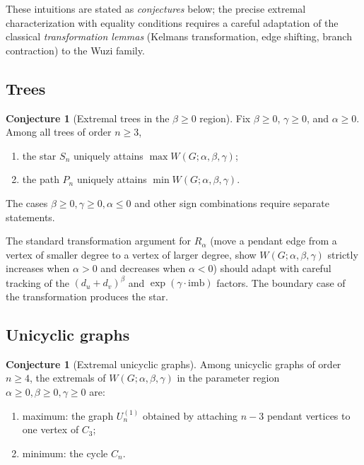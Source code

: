 \documentclass[11pt,a4paper]{article}
\theoremstyle{definition}
\newtheorem{conjecture}[theorem]{Conjecture}
\newcommand{\Wuzi}{W(G;\alpha,\beta,\gamma)}
\newcommand{\todo}[1]{}
\begin{document}
These intuitions are stated as \emph{conjectures} below; the
precise extremal characterization with equality conditions
requires a careful adaptation of the classical
\emph{transformation lemmas} (Kelmans transformation, edge
shifting, branch contraction) to the Wuzi family.

\subsection{Trees}

\begin{conjecture}[Extremal trees in the $\beta\ge 0$ region]
\label{conj:trees_beta_pos}
Fix $\beta\ge 0$, $\gamma\ge 0$, and $\alpha\ge 0$. Among all
trees of order $n\ge 3$,
\begin{enumerate}[label=(\alph*)]
\item the star $S_n$ uniquely attains $\max\Wuzi$;
\item the path $P_n$ uniquely attains $\min\Wuzi$.
\end{enumerate}
The cases $\beta\ge 0,\gamma\ge 0,\alpha\le 0$ and other sign
combinations require separate statements.
\end{conjecture}

\todo{PROOF STRATEGY} The standard transformation argument for
$R_\alpha$ (move a pendant edge from a vertex of smaller degree
to a vertex of larger degree, show $\Wuzi$ strictly increases when
$\alpha>0$ and decreases when $\alpha<0$) should adapt with
careful tracking of the $(d_u+d_v)^\beta$ and
$\exp(\gamma\cdot\mathrm{imb})$ factors. The boundary case of the
transformation produces the star.

\subsection{Unicyclic graphs}

\begin{conjecture}[Extremal unicyclic graphs]\label{conj:unicyclic}
Among unicyclic graphs of order $n\ge 4$, the extremals of $\Wuzi$
in the parameter region $\alpha\ge 0,\beta\ge 0,\gamma\ge 0$ are:
\begin{enumerate}[label=(\alph*)]
\item maximum: the graph $U_n^{(1)}$ obtained by attaching $n-3$
pendant vertices to one vertex of $C_3$;
\item minimum: the cycle $C_n$.
\end{enumerate}
\end{conjecture}
\end{document}
